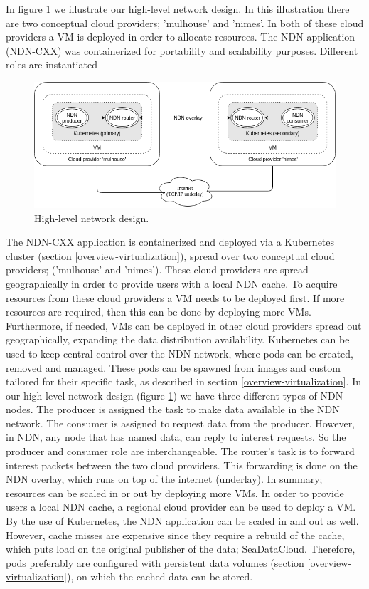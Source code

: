In figure \ref{fig:high-level-network-design} we illustrate our high-level network design. In this illustration there are two conceptual cloud providers; 'mulhouse' and 'nimes'. In both of these cloud providers a VM is deployed in order to allocate resources. The NDN application (NDN-CXX) was containerized for portability and scalability purposes. Different roles are instantiated 

\begin{figure}[H]
\centering
\includegraphics[width=\columnwidth]{Images/high-level-network-design.png}
\caption{High-level network design.}
\label{fig:high-level-network-design}
\end{figure}

The NDN-CXX application is containerized and deployed via a Kubernetes cluster (section \ref{overview-virtualization}), spread over two conceptual cloud providers; ('mulhouse' and 'nimes'). These cloud providers are spread geographically in order to provide users with a local NDN cache. To acquire resources from these cloud providers a VM needs to be deployed first. If more resources are required, then this can be done by deploying more VMs. Furthermore, if needed, VMs can be deployed in other cloud providers spread out geographically, expanding the data distribution availability. Kubernetes can be used to keep central control over the NDN network, where pods can be created, removed and managed. These pods can be spawned from images and custom tailored for their specific task, as described in section \ref{overview-virtualization}. In our high-level network design (figure \ref{fig:high-level-network-design}) we have three different types of NDN nodes. The producer is assigned the task to make data available in the NDN network. The consumer is assigned to request data from the producer. However, in NDN, any node that has named data, can reply to interest requests. So the producer and consumer role are interchangeable. The router's task is to forward interest packets between the two cloud providers. This forwarding is done on the NDN overlay, which runs on top of the internet (underlay). In summary; resources can be scaled in or out by deploying more VMs. In order to provide users a local NDN cache, a regional cloud provider can be used to deploy a VM. By the use of Kubernetes, the NDN application can be scaled in and out as well. However, cache misses are expensive since they require a rebuild of the cache, which puts load on the original publisher of the data; SeaDataCloud. Therefore, pods preferably are configured with persistent data volumes (section \ref{overview-virtualization}), on which the cached data can be stored.

